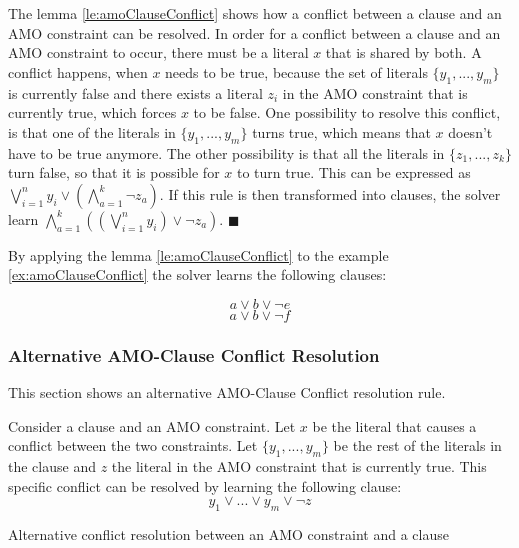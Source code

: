 The lemma \ref{le:amoClauseConflict} shows how a conflict between a clause and an AMO constraint can be resolved. In order for a conflict between a clause and an AMO constraint to occur, there must be a literal $x$ that is shared by both. A conflict happens, when $x$ needs to be true, because the set of literals $\{y_1,...,y_m\}$ is currently false and there exists a literal $z_i$ in the AMO constraint that is currently true, which forces $x$ to be false. One possibility to resolve this conflict, is that one of the literals in $\{y_1,...,y_m\}$ turns true, which means that $x$ doesn't have to be true anymore. The other possibility is that all the literals in $\{z_1,...,z_k\}$ turn false, so that it is possible for $x$ to turn true. This can be expressed as $\bigvee_{i=1}^{n}y_i \vee (\bigwedge_{a=1}^{k}\neg z_a)$. If this rule is then transformed into clauses, the solver learn $\bigwedge_{a=1}^{k}((\bigvee_{i=1}^{n}y_i)\vee \neg z_a)$. $\blacksquare$

By applying the lemma \ref{le:amoClauseConflict} to the example \ref{ex:amoClauseConflict} the solver learns the following clauses:

\begin{leftbar}
\begin{displaymath}
a \vee b \vee \neg e
\end{displaymath}
\begin{displaymath}
a \vee b \vee \neg f
\end{displaymath}
\end{leftbar}

\subsubsection{Alternative AMO-Clause Conflict Resolution}
This section shows an alternative AMO-Clause Conflict resolution rule.

\begin{lemma}
\begin{leftbar}
Consider a clause and an AMO constraint. Let $x$ be the literal that causes a conflict between the two constraints. Let $\{y_1,...,y_m\}$ be the rest of the literals in the clause and $z$ the literal in the AMO constraint that is currently true. This specific conflict can be resolved by learning the following clause:
\begin{displaymath}
y_1 \vee ... \vee y_m \vee \neg z
\end{displaymath}
\end{leftbar}
\caption{Alternative conflict resolution between an AMO constraint and a clause}
\label{le:alternativeAMOClauseConflict}
\end{lemma}


